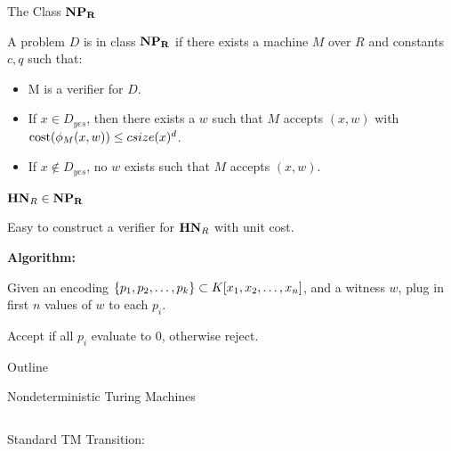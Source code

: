 \documentclass[c]{beamer}
\begin{document}
\begin{frame}{The Class $\mathbf{NP_R}$}

  A problem $D$ is in class $\mathbf{NP_R}$ if there exists a machine $M$ over
  $R$ and constants $c, q$ such that:

  \begin{itemize}
    \item M is a verifier for $D$.
    \item If $x \in D_{yes}$, then there exists a $w$ such that $M$
      accepts $(x, w)$ with $\text{cost}(\phi_M(x, w)) \leq c
      size(x)^d$.
    \item If $x \notin D_{yes}$, no $w$ exists such that $M$ accepts
      $(x, w)$.
  \end{itemize}
  
\end{frame}

\begin{frame}{$\mathbf{HN}_R \in \mathbf{NP_R}$}

  Easy to construct a verifier for $\mathbf{HN}_R$ with unit cost.

  \vspace{\baselineskip}

  \textbf{Algorithm:}

  Given an encoding $\{p_1, p_2, \ldots, p_k\} \subset K[x_1, x_2,\ldots,x_n]$,
  and a witness $w$, plug in first $n$ values of $w$ to each $p_i$.

  \vspace{\baselineskip}

  Accept if all $p_i$ evaluate to $0$, otherwise reject.

\end{frame}

\begin{frame}{Outline}
  \begin{center}
    \scaletopagewidth{\outlinefinal}
  \end{center}
\end{frame}

\begin{frame}{Nondeterministic Turing Machines}

  \begin{columns}

    Standard TM Transition:
       

    \begin{center}
      \detercomptm{}
    \end{center}
  \end{columns}
\end{frame}
\end{document}
